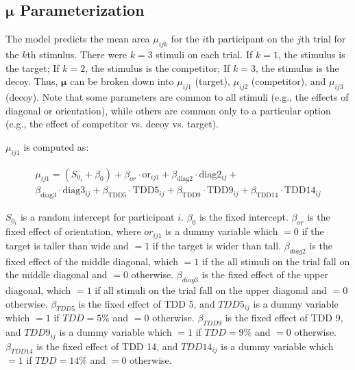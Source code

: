 \subsection{\texorpdfstring{$\boldsymbol{\mu}$}{mu} Parameterization}

The model predicts the mean area $\mu_{ijk}$ for the $i$th participant on the $j$th trial for the $k$th stimulus. There were $k=3$ stimuli on each trial. If $k=1$, the stimulus is the target; If $k=2$, the stimulus is the competitor; If $k=3$, the stimulus is the decoy. Thus, $\boldsymbol{\mu}$ can be broken down into $\mu_{ij1}$ (target), $\mu_{ij2}$ (competitor), and $\mu_{ij3}$ (decoy). Note that some parameters are common to all stimuli (e.g., the effects of diagonal or orientation), while others are common only to a particular option (e.g., the effect of competitor vs. decoy vs. target). 

$\mu_{ij1}$ is computed as:

\begin{equation}
\begin{aligned}
    \mu_{ij1} = (S_{0_i} + \beta_{0}) + \beta_{or} \cdot \mathrm{or}_{ij1} + \beta_{\mathrm{diag}2} \cdot \mathrm{diag}2_{ij} + \\
    \beta_{\mathrm{diag}3} \cdot \mathrm{diag}3_{ij} + \beta_{\mathrm{TDD}5} \cdot \mathrm{TDD}5_{ij} + \beta_{\mathrm{TDD}9} \cdot \mathrm{TDD}9_{ij} + \beta_{\mathrm{TDD}14} \cdot \mathrm{TDD}14_{ij}
\end{aligned}
\label{circle_mu_eqn1}
\end{equation}


$S_{0_i}$ is a random intercept for participant $i$. $\beta_{0}$ is the fixed intercept. $\beta_{or}$ is the fixed effect of orientation, where $or_{ij1}$ is a dummy variable which $=0$ if the target is taller than wide and $=1$ if the target is wider than tall. $\beta_{diag2}$ is the fixed effect of the middle diagonal, which $=1$ if the all stimuli on the trial fall on the middle diagonal and $=0$ otherwise. $\beta_{diag3}$ is the fixed effect of the upper diagonal, which $=1$ if all stimuli on the trial fall on the upper diagonal and $=0$ otherwise. $\beta_{TDD5}$ is the fixed effect of TDD 5, and $TDD5_{ij}$ is a dummy variable which $=1$ if $TDD=5\%$ and $=0$ otherwise. $\beta_{TDD9}$ is the fixed effect of TDD 9, and $TDD9_{ij}$ is a dummy variable which $=1$ if $TDD=9\%$ and $=0$ otherwise. $\beta_{TDD14}$ is the fixed effect of TDD 14, and $TDD14_{ij}$ is a dummy variable which $=1$ if $TDD=14\%$ and $=0$ otherwise. 

